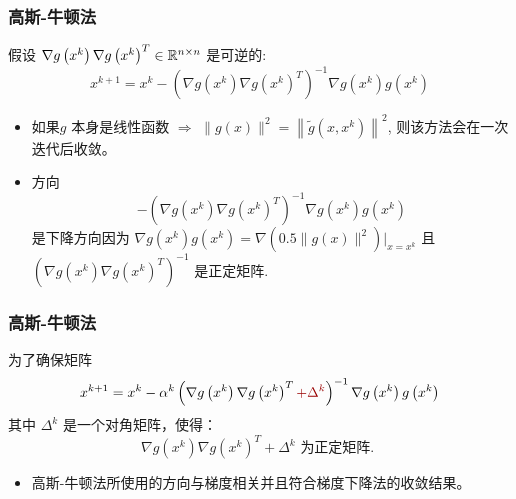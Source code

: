 \documentclass[11pt]{beamer}
\begin{document}
\begin{frame}
\frametitle{高斯-牛顿法}
假设 $\nabla g\left(x^{k}\right) \nabla g\left(x^{k}\right)^{T}\in \mathbb{R}^{n\times n}$ 是可逆的:
\begin{equation}	
x^{k+1}=x^{k}-\left(\nabla g\left(x^{k}\right) \nabla g\left(x^{k}\right)^{T}\right)^{-1} \nabla g\left(x^{k}\right) g\left(x^{k}\right)
\end{equation}
\begin{itemize}
\item 如果$g$ 本身是线性函数 $\Rightarrow$ $\|g(x)\|^{2}=\left\|\tilde{g}\left(x, x^{k}\right)\right\|^{2}$,  则该方法会在一次迭代后收敛。
\item 方向
$$
-\left(\nabla g\left(x^{k}\right) \nabla g\left(x^{k}\right)^{T}\right)^{-1} \nabla g\left(x^{k}\right) g\left(x^{k}\right)
$$
是下降方向因为  $\nabla g\left(x^{k}\right) g\left(x^{k}\right)  =\nabla \left( 0.5\|g(x)\|^{2}\right) |_{x = x^{k}}$ 且$\left(\nabla g\left(x^{k}\right) \nabla g\left(x^{k}\right)^{T}\right)^{-1}$ 是正定矩阵.
\end{itemize}
\end{frame}


\begin{frame}
\frametitle{高斯-牛顿法}

为了确保矩阵   
$$
x^{k+1}=x^{k}-\alpha^{k}\left(\nabla g\left(x^{k}\right) \nabla g\left(x^{k}\right)^{T}\dred{+\Delta^{k}}\right)^{-1} \nabla g\left(x^{k}\right) g\left(x^{k}\right)
$$
其中   $\Delta^{k}$ 是一个对角矩阵，使得：
$$
\nabla g\left(x^{k}\right) \nabla g\left(x^{k}\right)^{T}+\Delta^{k} \text { 为正定矩阵. }
$$
\begin{itemize}
    \item 高斯-牛顿法所使用的方向与梯度相关并且符合梯度下降法的收敛结果。
\end{itemize}
\end{frame}
\end{document}
